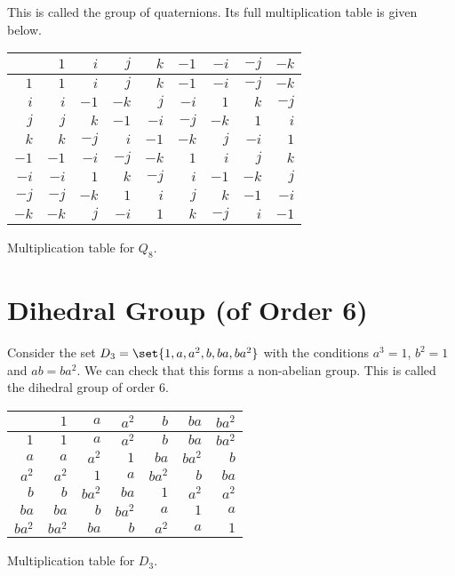 \documentclass[11pt]{penrose}
\newcommand{\keyword}[1]{\textsf{#1}}
\begin{document}
This is called the group of \keyword{quaternions}. Its full multiplication table is given below.
\begin{center}
\begin{tabularx}{0.62\textwidth}{|R||R|R|R|R|R|R|R|R|}
    \hline
         & $ 1$ & $ i$ & $ j$ & $ k$ & $-1$ & $-i$ & $-j$ & $-k$ \\ \hline\hline
    $ 1$ & $ 1$ & $ i$ & $ j$ & $ k$ & $-1$ & $-i$ & $-j$ & $-k$ \\ \hline
    $ i$ & $ i$ & $-1$ & $-k$ & $ j$ & $-i$ & $ 1$ & $ k$ & $-j$ \\ \hline
    $ j$ & $ j$ & $ k$ & $-1$ & $-i$ & $-j$ & $-k$ & $ 1$ & $ i$ \\ \hline
    $ k$ & $ k$ & $-j$ & $ i$ & $-1$ & $-k$ & $ j$ & $-i$ & $ 1$ \\ \hline
    $-1$ & $-1$ & $-i$ & $-j$ & $-k$ & $ 1$ & $ i$ & $ j$ & $ k$ \\ \hline
    $-i$ & $-i$ & $ 1$ & $ k$ & $-j$ & $ i$ & $-1$ & $-k$ & $ j$ \\ \hline
    $-j$ & $-j$ & $-k$ & $ 1$ & $ i$ & $ j$ & $ k$ & $-1$ & $-i$ \\ \hline
    $-k$ & $-k$ & $ j$ & $-i$ & $ 1$ & $ k$ & $-j$ & $ i$ & $-1$ \\ \hline
\end{tabularx}

{Multiplication table for $Q_8$.}
\end{center}

\section{Dihedral Group (of Order 6)}
Consider the set $D_3  =\set{1, a, a^2, b, ba, ba^2}$ with the conditions $a^3 = 1$, $b^2 = 1$ and $ab = ba^2$. We can check that this forms a non-abelian group. This is called the \keyword{dihedral group} of order $6$.

\begin{center}
\begin{tabularx}{0.62\textwidth}{|R||R|R|R|R|R|R|}
    \hline
           & $   1$ & $   a$ & $ a^2$ & $   b$ & $  ba$ & $ba^2$ \\ \hline\hline
    $   1$ & $   1$ & $   a$ & $ a^2$ & $   b$ & $  ba$ & $ba^2$ \\ \hline
    $   a$ & $   a$ & $ a^2$ & $   1$ & $  ba$ & $ba^2$ & $   b$ \\ \hline
    $ a^2$ & $ a^2$ & $   1$ & $   a$ & $ba^2$ & $   b$ & $  ba$ \\ \hline
    $   b$ & $   b$ & $ba^2$ & $  ba$ & $   1$ & $ a^2$ & $ a^2$ \\ \hline
    $  ba$ & $  ba$ & $   b$ & $ba^2$ & $   a$ & $   1$ & $   a$ \\ \hline
    $ba^2$ & $ba^2$ & $  ba$ & $   b$ & $ a^2$ & $   a$ & $   1$ \\ \hline
\end{tabularx}

{Multiplication table for $D_3$.}
\end{center}
\end{document}

